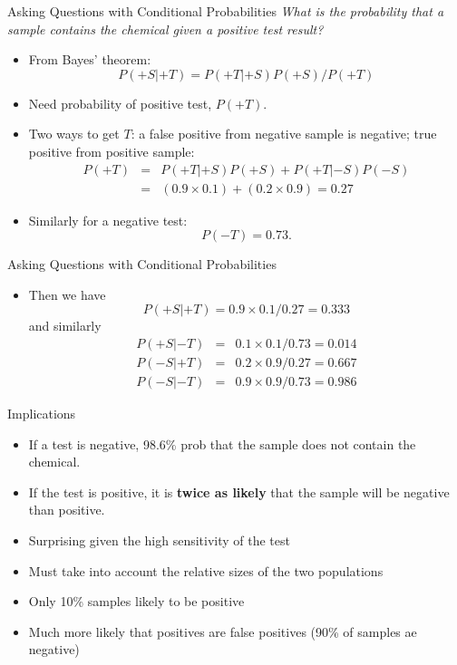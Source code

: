 \documentclass{beamer}
\begin{document}
\begin{frame}{Asking Questions with Conditional Probabilities}
  \textit{What is the probability that a sample contains the chemical given a positive test result?}
  \begin{itemize}
    \item From Bayes' theorem:
      \begin{equation*}
        P(+S|+T) = P(+T|+S)P(+S)/P(+T)
      \end{equation*}
    \item Need probability of positive test, $P(+T)$.
    \item Two ways to get $T$: a false positive from negative sample is negative; true positive from positive sample:
      \begin{eqnarray*}
        P(+T) &=& P(+T|+S)P(+S)+P(+T|-S)P(-S)\\  &=& (0.9\times0.1)+(0.2\times 0.9) = 0.27
      \end{eqnarray*}
      \item Similarly for a negative test:
        \begin{equation*}
          P(-T) = 0.73.
        \end{equation*}
  \end{itemize}
\end{frame}

\begin{frame}{Asking Questions with Conditional Probabilities}
  \begin{itemize}
     \item Then we have
       \begin{equation*}
         P(+S|+T) = 0.9\times0.1/0.27 = 0.333
        \end{equation*}
       and similarly
       \begin{eqnarray*}
          P(+S|-T) &=& 0.1\times0.1/0.73 = 0.014\\
          P(-S|+T) &=& 0.2\times0.9/0.27 = 0.667\\
          P(-S|-T) &=& 0.9\times0.9/0.73 = 0.986
       \end{eqnarray*}
  \end{itemize}
\end{frame}

\begin{frame}{Implications}
  \begin{itemize}
    \item If a test is negative, 98.6\% prob that the sample does not contain the chemical.
    \item If the test is positive, it is \textbf{twice as likely} that the sample will be negative than positive.
    \item Surprising given the high sensitivity of the test
    \item Must take into account the relative sizes of the two populations
    \item Only 10\% samples likely to be positive
    \item Much more likely that positives are false positives (90\% of samples ae negative)
  \end{itemize}
\end{frame}
\end{document}

